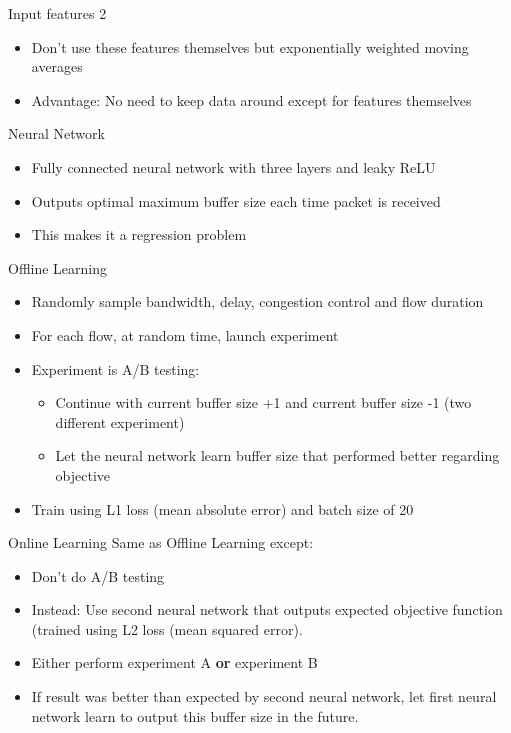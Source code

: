 \documentclass[xcolor={dvipsnames}]{beamer}
\begin{document}
\begin{frame}{Input features 2}
\begin{itemize}
\item Don't use these features themselves but exponentially weighted moving averages
\item Advantage: No need to keep data around except for features themselves
\end{itemize}
\end{frame}

\begin{frame}{Neural Network}
\begin{itemize}
\item Fully connected neural network with three layers and leaky ReLU
\item Outputs optimal maximum buffer size each time packet is received
\item This makes it a regression problem
\end{itemize}
\end{frame}

\begin{frame}{Offline Learning}
\begin{itemize}
\item Randomly sample bandwidth, delay, congestion control and flow duration
\item For each flow, at random time, launch experiment
\item Experiment is A/B testing: 
\begin{itemize}
\item Continue with current buffer size +1 and current buffer size -1 (two different experiment)
\item Let the neural network learn buffer size that performed better regarding objective
\end{itemize}
\item Train using L1 loss (mean absolute error) and batch size of 20
\end{itemize}
\end{frame}

\begin{frame}{Online Learning}
Same as Offline Learning except:
\begin{itemize}
\item Don't do A/B testing
\item Instead: Use second neural network that outputs expected objective function (trained using L2 loss (mean squared error).
\item Either perform experiment A \textbf{or} experiment B
\item If result was better than expected by second neural network, let first neural network learn to output this buffer size in the future.
\end{itemize}
\end{frame}
\end{document}
